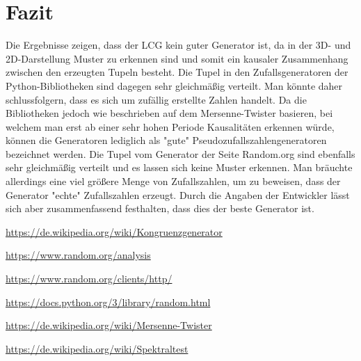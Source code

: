 \documentclass[12pt]{article}
\begin{document}
    \section{Fazit}\label{sec:fazit}
    Die Ergebnisse zeigen, dass der LCG kein guter Generator ist, da in der 3D- und 2D-Darstellung Muster zu erkennen sind und somit ein kausaler Zusammenhang zwischen den erzeugten Tupeln besteht.
    Die Tupel in den Zufallsgeneratoren der Python-Bibliotheken sind dagegen sehr gleichmäßig verteilt.
    Man könnte daher schlussfolgern, dass es sich um zufällig erstellte Zahlen handelt.
    Da die Bibliotheken jedoch wie beschrieben auf dem Mersenne-Twister basieren, bei welchem man erst ab einer sehr hohen Periode Kausalitäten erkennen würde,
    können die Generatoren lediglich als "gute" Pseudozufallszahlengeneratoren bezeichnet werden.
    Die Tupel vom Generator der Seite Random.org sind ebenfalls sehr gleichmäßig verteilt und es lassen sich keine Muster erkennen.
    Man bräuchte allerdings eine viel größere Menge von Zufallszahlen, um zu beweisen, dass der Generator "echte" Zufallszahlen erzeugt.
    Durch die Angaben der Entwickler lässt sich aber zusammenfassend festhalten, dass dies der beste Generator ist.


    \vfill

    \begin{thebibliography}{12345}

        \url{https://de.wikipedia.org/wiki/Kongruenzgenerator}

        \url{https://www.random.org/analysis}

        \url{https://www.random.org/clients/http/}

        \url{https://docs.python.org/3/library/random.html}

        \url{https://de.wikipedia.org/wiki/Mersenne-Twister}

        \url{https://de.wikipedia.org/wiki/Spektraltest}

    \end{thebibliography}
\end{document}
